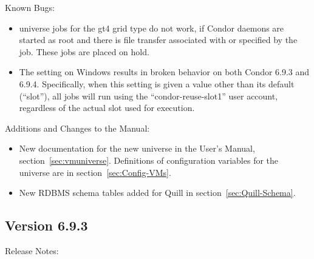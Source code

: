 \noindent Known Bugs:

\begin{itemize}

\item {} universe jobs for the gt4 grid type do not work, 
if Condor daemons are started as root
and there is file transfer associated with or specified by the job.
These jobs are placed on hold.

\item The  setting on Windows results
in broken behavior on both Condor 6.9.3 and 6.9.4. Specifically, when
this setting is given a value other than its default (``slot''), all
jobs will run using the ``condor-reuse-slot1'' user account,
regardless of the actual slot used for execution.

\end{itemize}

\noindent Additions and Changes to the Manual:

\begin{itemize}

\item New documentation for the new  universe
in the User's Manual, section~\ref{sec:vmuniverse}.
Definitions of configuration variables for the  universe are in
section~\ref{sec:Config-VMs}.

\item New RDBMS schema tables added for Quill in
section~\ref{sec:Quill-Schema}.

\end{itemize}

\subsection*{\label{sec:New-6-9-3}Version 6.9.3}

\noindent Release Notes:

